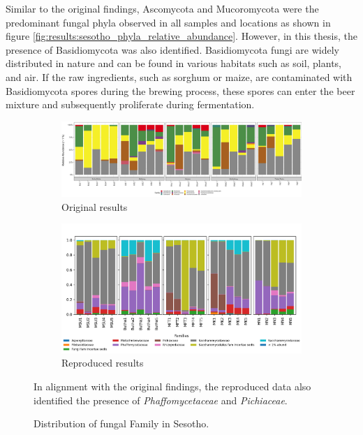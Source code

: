     Similar to the original findings, Ascomycota and Mucoromycota were the predominant fungal phyla observed in all samples and locations as shown in figure \ref{fig:results:sesotho_phyla_relative_abundance}. However, in this thesis, the presence of Basidiomycota was also identified. Basidiomycota fungi are widely distributed in nature and can be found in various habitats such as soil, plants, and air. If the raw ingredients, such as sorghum or maize, are contaminated with Basidiomycota spores during the brewing process, these spores can enter the beer mixture and subsequently proliferate during fermentation.

        \begin{figure}[H]
        \centering
        \begin{subfigure}[b]{1\textwidth}
            \centering
            \includegraphics[width=\textwidth]{images/sesotho/original_sesotho_families_relative_abundance.png}
            \caption{Original results}
        \end{subfigure}
        \hfill
        \begin{subfigure}[b]{1\textwidth}
            \centering
            \includegraphics[width=\textwidth]{images/sesotho/sesotho_family_relative_abundance.png}
            \caption{Reproduced results}
        \end{subfigure}
        \caption{Distribution of fungal Family in Sesotho.}
        \small In alignment with the original findings, the reproduced data also identified the presence of \textit{Phaffomycetaceae} and \textit{Pichiaceae}.
        \label{fig:results:sesotho_family_relative_abundance}
    \end{figure}
    
